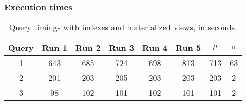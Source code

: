 \subsubsection{Execution times}

\begin{table}[!h]
\centering
\begin{tabular}{|| c | c c c c c | c c ||} 
 \hline
 Query & Run 1 & Run 2 & Run 3 & Run 4 & Run 5 & 	$\mu$ & $\sigma$ \\ [0.5ex] 
 \hline\hline
 1 & 643 & 685 & 724 & 698 & 813 & 713 & 63 \\ 
 \hline
 2 & 201 & 203 & 205 & 203 & 203 & 203 & 2 \\
 \hline
 3 & 98 & 102 & 101 & 102 & 101 & 101 & 2 \\
 \hline
\end{tabular}
  \caption{Query timings with indexes and materialized views, in seconds.}
  \label{tab:materializationstimings}
\end{table}

